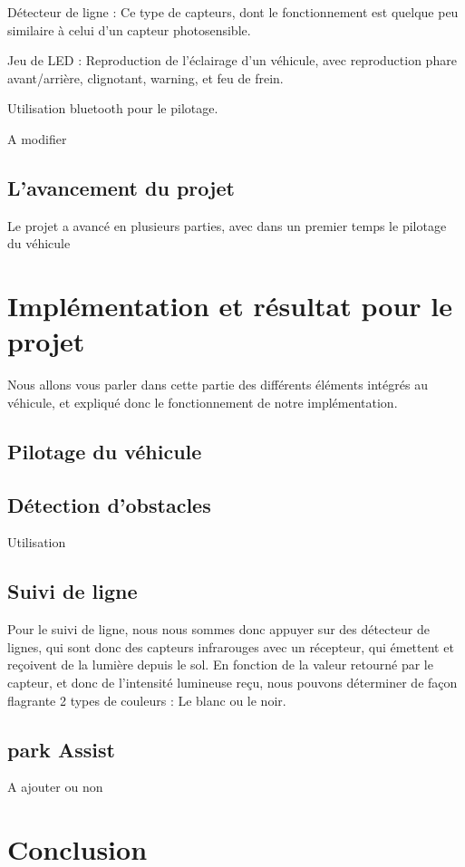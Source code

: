 \documentclass[a4paper, 12pt]{book}
\begin{document}
Détecteur de ligne : Ce type de capteurs, dont le fonctionnement est quelque peu similaire à celui d’un capteur photosensible.
 
Jeu de LED : Reproduction de l'éclairage d'un véhicule, avec reproduction phare avant/arrière, clignotant, warning, et feu de frein.

Utilisation bluetooth pour le pilotage.

A modifier

\section{L'avancement du projet}

Le projet a avancé en plusieurs parties, avec dans un premier temps le pilotage du véhicule

\chapter{Implémentation et résultat pour le projet}

Nous allons vous parler dans cette partie des différents éléments intégrés au véhicule, et expliqué donc le fonctionnement de notre implémentation.


\section{Pilotage du véhicule}


\section{Détection d'obstacles}
Utilisation 

\section{Suivi de ligne}
Pour le suivi de ligne, nous nous sommes donc appuyer sur des détecteur de lignes, qui sont donc des capteurs infrarouges avec un récepteur, qui émettent et reçoivent de la lumière depuis le sol. En fonction de la valeur retourné par le capteur, et donc de l'intensité lumineuse reçu, nous pouvons déterminer de façon flagrante 2 types de couleurs : Le blanc ou le noir.\\

 
\section{park Assist}
A ajouter ou non



\chapter{Conclusion\label{chap-conclusion}}




\end{document}
